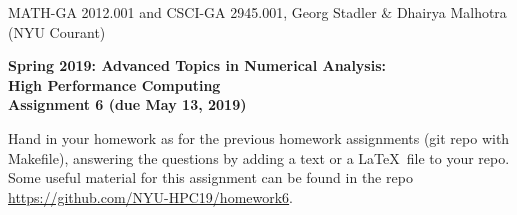 \documentclass[12pt]{article}
\begin{document}
\begin{center}
  \vspace*{-2cm}
{\small MATH-GA 2012.001 and CSCI-GA 2945.001, Georg Stadler \&
  Dhairya Malhotra (NYU Courant)}
\end{center}
\vspace*{.5cm}
\begin{center}
\large \textbf{%
Spring 2019: Advanced Topics in Numerical Analysis: \\
High Performance Computing \\
Assignment 6 (due May 13, 2019) }
\end{center}

 Hand in your homework as for
the previous homework assignments (git repo with Makefile), answering
the questions by adding a text or a \LaTeX\ file to your repo. Some
useful material for this assignment can be found in the repo \url{https://github.com/NYU-HPC19/homework6}.
\\[.2ex]
\end{document}
